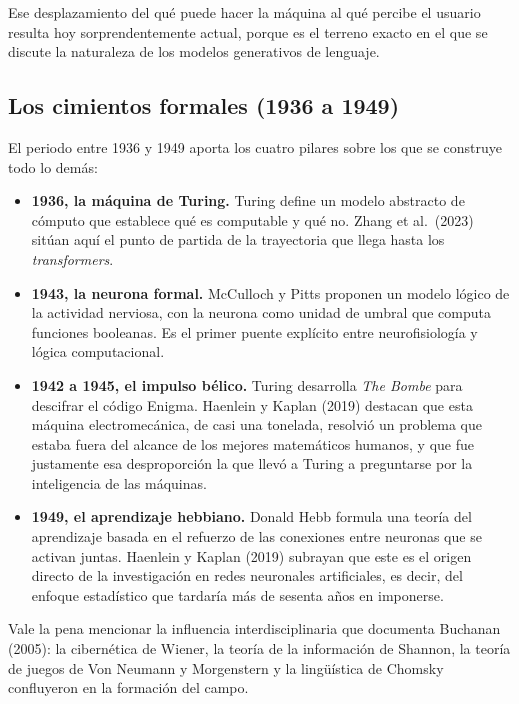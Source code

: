 \documentclass[12pt,letterpaper,oneside]{article}
\begin{document}
Ese desplazamiento del qué puede hacer la máquina al qué percibe el usuario resulta hoy sorprendentemente actual, porque es el terreno exacto en el que se discute la naturaleza de los modelos generativos de lenguaje.

\subsection{Los cimientos formales (1936 a 1949)}

El periodo entre 1936 y 1949 aporta los cuatro pilares sobre los que se construye todo lo demás:

\begin{itemize}[leftmargin=1.4cm,itemsep=0.25em]
  \item \textbf{1936, la máquina de Turing.} Turing define un modelo abstracto de cómputo que establece qué es computable y qué no. Zhang et al.\ (2023) sitúan aquí el punto de partida de la trayectoria que llega hasta los \textit{transformers}.
  \item \textbf{1943, la neurona formal.} McCulloch y Pitts proponen un modelo lógico de la actividad nerviosa, con la neurona como unidad de umbral que computa funciones booleanas. Es el primer puente explícito entre neurofisiología y lógica computacional.
  \item \textbf{1942 a 1945, el impulso bélico.} Turing desarrolla \textit{The Bombe} para descifrar el código Enigma. Haenlein y Kaplan (2019) destacan que esta máquina electromecánica, de casi una tonelada, resolvió un problema que estaba fuera del alcance de los mejores matemáticos humanos, y que fue justamente esa desproporción la que llevó a Turing a preguntarse por la inteligencia de las máquinas.
  \item \textbf{1949, el aprendizaje hebbiano.} Donald Hebb formula una teoría del aprendizaje basada en el refuerzo de las conexiones entre neuronas que se activan juntas. Haenlein y Kaplan (2019) subrayan que este es el origen directo de la investigación en redes neuronales artificiales, es decir, del enfoque estadístico que tardaría más de sesenta años en imponerse.
\end{itemize}

Vale la pena mencionar la influencia interdisciplinaria que documenta Buchanan (2005): la cibernética de Wiener, la teoría de la información de Shannon, la teoría de juegos de Von Neumann y Morgenstern y la lingüística de Chomsky confluyeron en la formación del campo.


\end{document}

